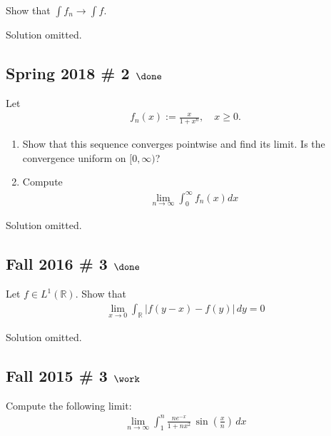 Show that \(\int f_{n} \rightarrow \int f\).

Solution omitted.

\hypertarget{spring-2018-2-done}{%
\subsection{\texorpdfstring{Spring 2018 \# 2
\(\done\)}{Spring 2018 \# 2 \textbackslash done}}\label{spring-2018-2-done}}

Let
\begin{align*}
f_{n}(x):=\frac{x}{1+x^{n}}, \quad x \geq 0.
\end{align*}

\begin{enumerate}
\def\labelenumi{\alph{enumi}.}
\item
  Show that this sequence converges pointwise and find its limit. Is the
  convergence uniform on \([0, \infty)\)?
\item
  Compute
  \begin{align*}
  \lim _{n \rightarrow \infty} \int_{0}^{\infty} f_{n}(x) d x
  \end{align*}
\end{enumerate}


Solution omitted.

\hypertarget{fall-2016-3-done}{%
\subsection{\texorpdfstring{Fall 2016 \# 3
\(\done\)}{Fall 2016 \# 3 \textbackslash done}}\label{fall-2016-3-done}}

Let \(f\in L^1({\mathbb{R}})\). Show that
\begin{align*}
\lim _{x \to 0} \int _{{\mathbb{R}}} {\left\lvert {f(y-x)-f(y)} \right\rvert} \, dy = 0
\end{align*}

Solution omitted.

\hypertarget{fall-2015-3-work}{%
\subsection{\texorpdfstring{Fall 2015 \# 3
\(\work\)}{Fall 2015 \# 3 \textbackslash work}}\label{fall-2015-3-work}}

Compute the following limit:
\begin{align*}
\lim _{n \rightarrow \infty} \int_{1}^{n} \frac{n e^{-x}}{1+n x^{2}} \, \sin \left(\frac x n\right) \, dx
\end{align*}

